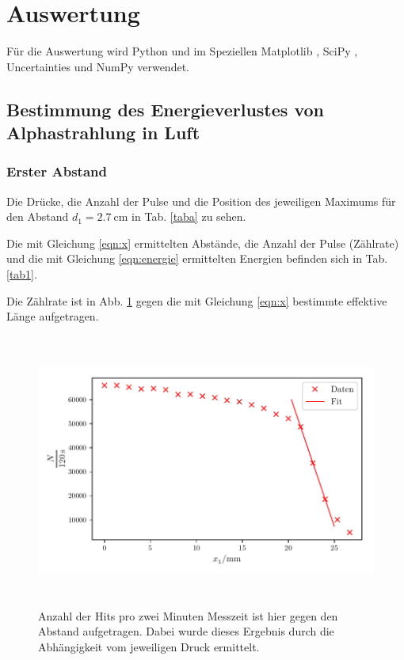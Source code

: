 \section{Auswertung}
\label{sec:Auswertung}

Für die Auswertung wird Python und im Speziellen Matplotlib \cite{matplotlib}, SciPy \cite{scipy}, Uncertainties \cite{uncertainties} und NumPy \cite{numpy} verwendet.

\subsection{Bestimmung des Energieverlustes von Alphastrahlung in Luft}

\subsubsection{Erster Abstand}
Die Drücke, die Anzahl der Pulse und die Position des jeweiligen Maximums für den Abstand $d_1 = \SI{2.7}{\centi\meter}$ in Tab. \ref{taba} zu sehen.
 
 

\noindent Die mit Gleichung \eqref{eqn:x} ermittelten Abstände, die Anzahl der Pulse (Zählrate) und die mit Gleichung \eqref{eqn:energie} ermittelten Energien befinden sich in Tab. \ref{tab1}. 

 

\noindent Die Zählrate ist in Abb. \ref{zaehlrate1} gegen die mit Gleichung \eqref{eqn:x} bestimmte effektive Länge aufgetragen.

\begin{figure}
    \centering
    \includegraphics[width=15cm, height=9cm]{build/plota.pdf}
    \caption{Anzahl der Hits pro zwei Minuten Messzeit ist hier gegen den Abstand aufgetragen. Dabei wurde dieses Ergebnis durch die Abhängigkeit vom jeweiligen Druck ermittelt.}
    \label{zaehlrate1}
\end{figure}

